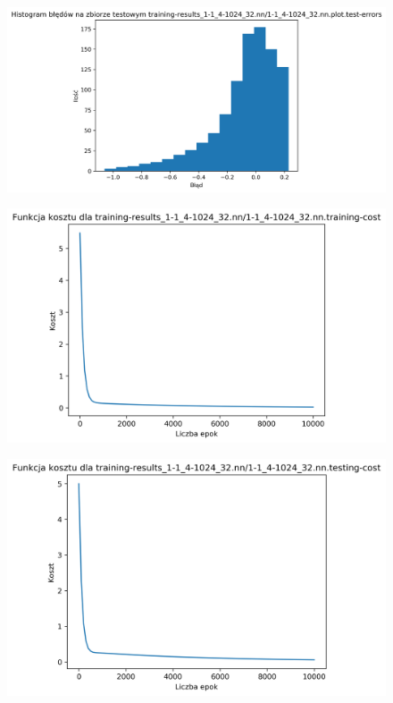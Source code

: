 \documentclass{classrep}
\begin{document}
{{{\begin{figure}[!htbp]
                \end{figure}
                \begin{figure}[!htbp]
                    \centering
                    \includegraphics[width=140mm]{wykresy/1-1_4-1024_32_nn_plot_test-errors.png}
                \end{figure}
                \begin{figure}[!htbp]
                    \centering
                    \includegraphics[width=140mm]{wykresy/1-1_4-1024_32_nn_training-cost.png}
                \end{figure}
                \begin{figure}[!htbp]
                    \centering
                    \includegraphics[width=120mm]{wykresy/1-1_4-1024_32_nn_testing-cost.png}

\end{figure}}}}
\end{document}
